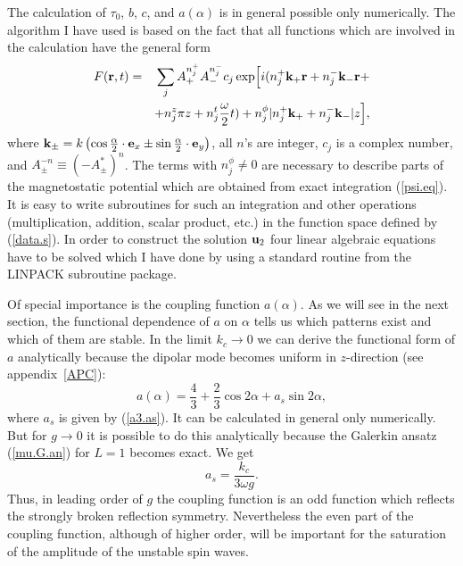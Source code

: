 The calculation of $\tau_0$, $b$, $c$, and $a(\alpha)$ is in general 
possible only numerically. The algorithm I have used is based on the 
fact that all functions which are involved in the calculation 
have the general form
\begin{eqnarray}
  F({\bf r},t)&=&\sum_jA_+^{n_j^+}A_-^{n_j^-}c_j\exp\Bigl[
   i(n_j^+{\bf k}_+{\bf r}+n_j^-{\bf k}_-{\bf r}+\nonumber\\
  &&+n_j^z\pi z+n_j^t\frac{\omega}{2}t)+n_j^\phi|n_j^+{\bf k}_+
  +n_j^-{\bf k}_-|z\Bigr],
  \label{data.s}
\end{eqnarray}
where ${\bf k}_\pm=k\left(\cos\frac{\alpha}{2}\cdot{\bf e}_x\pm\sin
\frac{\alpha}{2}\cdot{\bf e}_y\right)$, all $n$'s are integer, 
$c_j$ is a complex number, and 
$A_\pm^{-n}\equiv\left(-A_\pm^*\right)^n$. The terms with
$n_j^\phi\not=0$ are necessary to describe parts of the magnetostatic
potential which are obtained from exact integration 
(\ref{psi.eq}). It is easy to write subroutines for such an
integration and other operations (multiplication, addition, scalar
product, etc.) in the function space defined by (\ref{data.s}). In
order to construct the solution ${\bf u}_2$ four linear algebraic
equations have to be solved which I have done by using a standard
routine from the LINPACK subroutine package.

Of special importance is the coupling function $a(\alpha)$. As we
will see in the next section, the functional dependence of $a$ on
$\alpha$ tells us which patterns exist and which of them are
stable. In the limit $k_c\to 0$ we can derive the functional form of
$a$ analytically because the dipolar mode becomes
uniform in $z$-direction (see appendix~\ref{APC}):
\begin{equation}
  a(\alpha)=\frac{4}{3}+\frac{2}{3}\cos 2\alpha+a_s\sin 2\alpha,
  \label{a.lim}
\end{equation}
where $a_s$ is given by (\ref{a3.as}). It can be calculated in
general only numerically. But for $g\to 0$ it is possible to do 
this analytically because the Galerkin ansatz (\ref{mu.G.an}) 
for $L=1$ becomes exact. We get 
\begin{equation}
  a_s=\frac{k_c}{3\omega g}.
  \label{as}
\end{equation}
Thus, in leading order of $g$ the coupling function is an odd
function which reflects the strongly broken reflection symmetry.
Nevertheless the even part of the coupling function, although of
higher order, will be important for the saturation of the amplitude
of the unstable spin waves.

